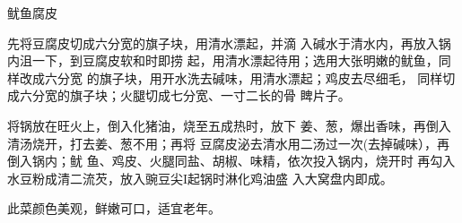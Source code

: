 \begin{recipe}{鱿鱼腐皮}

\ingredients



\cooking

\step 先将豆腐皮切成六分宽的旗子块，用清水漂起，并滴 入碱水于清水内，再放入锅内沮一下，到豆腐皮软和时即捞 起，用清水漂起待用；选用大张明嫩的鱿鱼，同样改成六分宽 的旗子块，用开水洗去碱味，用清水漂起；鸡皮去尽细毛， 同样切成六分宽的旗子块；火腿切成七分宽、一寸二长的骨 睥片子。

\step 将锅放在旺火上，倒入化猪油，烧至五成热时，放下 姜、葱，爆出香味，再倒入清汤烧开，打去姜、葱不用；再将 豆腐皮泌去清水用二汤过一次(去掉碱味），再倒入锅内；鱿 鱼、鸡皮、火腿同盐、胡椒、味精，依次投入锅内，烧开时 再勾入水豆粉成清二流芡，放入豌豆尖I起锅时淋化鸡油盛 入大窝盘内即成。

\notes

此菜颜色美观，鲜嫩可口，适宜老年。

\end{recipe}

